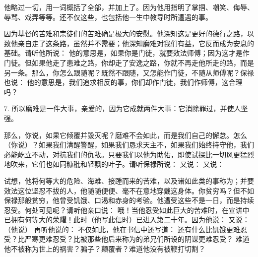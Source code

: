 他略过一切，用一词概括了全部，并加上了。因为他用指明了掌掴、嘲笑、侮辱、辱骂、戏弄等等。还不仅这些，也包括他一生中教导时所遭遇的事。\par

因为基督的苦难和宗徒们的苦难确是极大的安慰。他深知这是更好的德行之路，以致他亲自走了这条路，虽然并不需要；他深知磨难对我们有益，它反而成为安息的基础。请听他所说： 他的意思是，如果你是门徒，就要效法师傅；因为这才是作门徒。但如果他走了患难之路，你却走了安逸之路，你就不再走他所走的路，而是另一条。那么，你怎么跟随呢？既然不跟随，又怎能作门徒，不随从师傅呢？保禄也说： 他的意思是，我们追求相反的事，你们却作门徒，我们作师傅，这合理吗？\par

7. 所以磨难是一件大事，亲爱的，因为它成就两件大事：它消除罪过，并使人坚强。\par

那么，你说，如果它倾覆并毁灭呢？磨难不会如此，而是我们自己的懈怠。怎么（你说）？如果我们清醒警醒，如果我们恳求天主不，如果我们始终持守他，我们必能屹立不动，对抗我们的仇敌。只要我们以他为助佑，即使试探比一切风更猛烈地吹来，它们也如同糠秕和轻飘的叶子。请听保禄所说： 又说： 又说：\par

试想，他将何等大的危险、海难、接踵而来的苦难，以及诸如此类的事称为；并要效法这位坚忍不拔的人，他随随便便、毫不在意地穿戴这身体。你贫穷吗？但不如保禄那般贫穷，他曾受饥饿、口渴和赤身的考验。他遭受这些不是一日，而是持续忍受。何处可见呢？请听他亲口说： 哦！当他忍受如此巨大的苦难时，在宣讲中已拥有何等大的荣耀！此时（他写此信时）已进入第二十年。因为他说： 又说：（他说） 再听他说的： 不仅如此，他在书信中还写道： 还有什么比饥饿更难忍受？比严寒更难忍受？比被那些他后来称为的弟兄们所设的阴谋更难忍受？ 难道他不被称为世上的祸害？骗子？颠覆者？难道他没有被鞭打切割？\par


